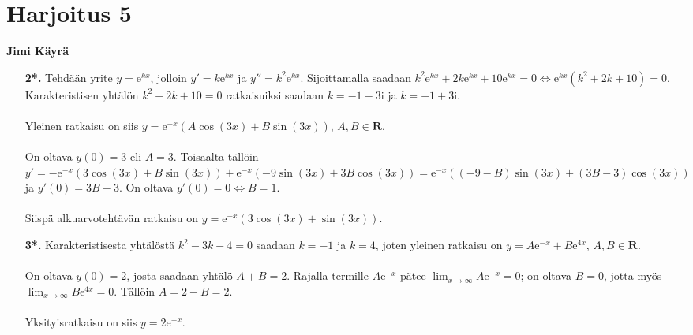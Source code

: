 \documentclass[12pt,fleqn]{article}
\begin{document}
\newpage
\section*{Harjoitus 5}
\textbf{Jimi Käyrä}\\
\begin{enumerate}[label=\textbf{\arabic*.}]
\item [\textbf{2*.}] Tehdään yrite \(y=\text{e}^{kx}\), jolloin \(y'=k\text{e}^{kx}\) ja \(y''=k^2\text{e}^{kx}\). Sijoittamalla saadaan \(k^2\text{e}^{kx}+2k\text{e}^{kx}+10\text{e}^{kx}=0 \iff \text{e}^{kx} (k^2+2k+10)=0\). Karakteristisen yhtälön \(k^2+2k+10=0\) ratkaisuiksi saadaan \(k=-1-3\mathrm{i}\) ja \(k=-1+3\mathrm{i}\).\\
 \\
Yleinen ratkaisu on siis \(y=\text{e}^{-x} (A\cos (3x)+B\sin (3x))\), \(A, B\in \mathbf{R}\).\\
 \\
On oltava \(y(0)=3\) eli \(A=3\). Toisaalta tällöin \(y'=-\text{e}^{-x} (3\cos (3x)+B\sin (3x))+\text{e}^{-x} (-9\sin (3x) + 3B\cos (3x))=\text{e}^{-x} ((-9-B)\sin (3x)+(3B-3)\cos (3x))\) ja \(y'(0)=3B-3\). On oltava \(y'(0)=0\iff B=1\).\\
 \\
Siispä alkuarvotehtävän ratkaisu on \(y=\text{e}^{-x}(3\cos (3x)+\sin (3x))\).

\item [\textbf{3*.}] Karakteristisesta yhtälöstä \(k^2-3k-4=0\) saadaan \(k=-1\) ja \(k=4\), joten yleinen ratkaisu on \(y=A\text{e}^{-x}+B\text{e}^{4x}\), \(A, B\in \mathbf{R}\).\\
 \\
On oltava \(y(0)=2\), josta saadaan yhtälö \(A+B=2\). Rajalla termille \(A\text{e}^{-x}\) pätee \(\displaystyle \lim_{x\to \infty} A\text{e}^{-x}=0\); on oltava \(B=0\), jotta myös \(\displaystyle \lim_{x\to \infty} B\text{e}^{4x}=0\). Tällöin \(A=2-B=2\).\\
 \\
Yksityisratkaisu on siis \(y=2\text{e}^{-x}\).
\end{enumerate}

\newpage
\end{document}
